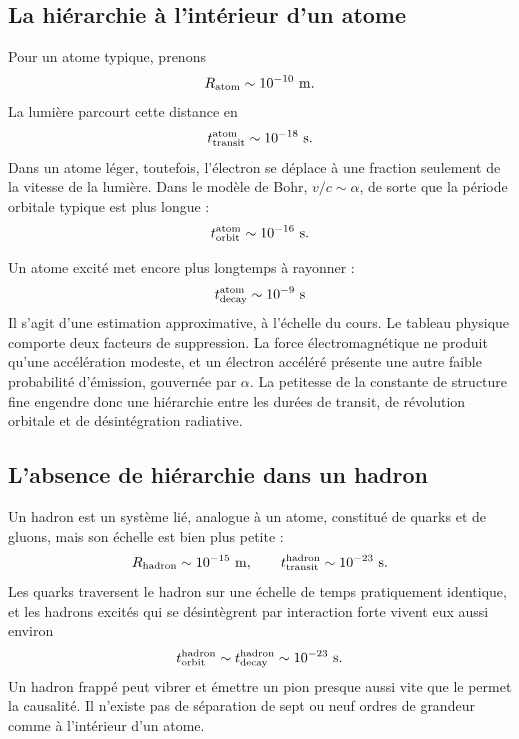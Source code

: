 \subsection{La hiérarchie à l’intérieur d’un atome}

Pour un atome typique, prenons
\begin{equation}
R_{\rm atom}\sim10^{-10}\ {\rm m}.
\end{equation}
La lumière parcourt cette distance en
\begin{equation}
t_{\rm transit}^{\rm atom}\sim10^{-18}\ {\rm s}.
\end{equation}
Dans un atome léger, toutefois, l’électron se déplace à une fraction seulement de la vitesse de la lumière. Dans le modèle de Bohr, \(v/c\sim\alpha\), de sorte que la période orbitale typique est plus longue :
\begin{equation}
t_{\rm orbit}^{\rm atom}\sim10^{-16}\ {\rm s}.
\end{equation}

Un atome excité met encore plus longtemps à rayonner :
\begin{equation}
t_{\rm decay}^{\rm atom}\sim10^{-9}\ {\rm s}
\end{equation}
Il s’agit d’une estimation approximative, à l’échelle du cours. Le tableau physique comporte deux facteurs de suppression. La force électromagnétique ne produit qu’une accélération modeste, et un électron accéléré présente une autre faible probabilité d’émission, gouvernée par \(\alpha\). La petitesse de la constante de structure fine engendre donc une hiérarchie entre les durées de transit, de révolution orbitale et de désintégration radiative.

\subsection{L’absence de hiérarchie dans un hadron}

Un hadron est un système lié, analogue à un atome, constitué de quarks et de gluons, mais son échelle est bien plus petite :
\begin{equation}
R_{\rm hadron}\sim10^{-15}\ {\rm m},
\qquad
t_{\rm transit}^{\rm hadron}\sim10^{-23}\ {\rm s}.
\end{equation}
Les quarks traversent le hadron sur une échelle de temps pratiquement identique, et les hadrons excités qui se désintègrent par interaction forte vivent eux aussi environ
\begin{equation}
t_{\rm orbit}^{\rm hadron}
\sim t_{\rm decay}^{\rm hadron}
\sim10^{-23}\ {\rm s}.
\end{equation}
Un hadron frappé peut vibrer et émettre un pion presque aussi vite que le permet la causalité. Il n’existe pas de séparation de sept ou neuf ordres de grandeur comme à l’intérieur d’un atome.

